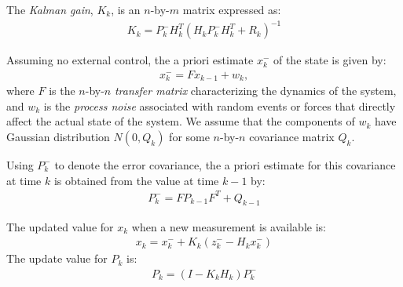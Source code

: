 The \textit{Kalman gain}, $K_k$, is an $n$-by-$m$ matrix expressed as:
\begin{align*}
K_k = P_k^-H_k^T(H_kP_k^-H_k^T + R_k)^{-1}
\end{align*}

Assuming no external control, the a priori estimate $x_k^-$ of the state is
given by:
\begin{align*}
x_k^- = Fx_{k - 1} + w_k,
\end{align*}
where $F$ is the $n$-by-$n$ \textit{transfer matrix} characterizing the
dynamics of the system, and $w_k$ is the \textit{process noise} associated with
random events or forces that directly affect the actual state of the system. We assume that the components of $w_k$
have Gaussian distribution $N(0, Q_k)$ for some $n$-by-$n$ covariance matrix
$Q_k$.

Using $P_k^-$ to denote the error covariance, the a priori estimate for this
covariance at time $k$ is obtained from the value at time $k - 1$ by:
\begin{align*}
P_k^- = FP_{k - 1}F^T + Q_{k - 1}
\end{align*}

The updated value for $x_k$ when a new measurement is available is:
\begin{align*}
x_k = x_k^- + K_k(z_k^- - H_kx_k^-)
\end{align*}
The update value for $P_k$ is:
\begin{align*}
P_k = (I - K_kH_k)P_k^-
\end{align*}
